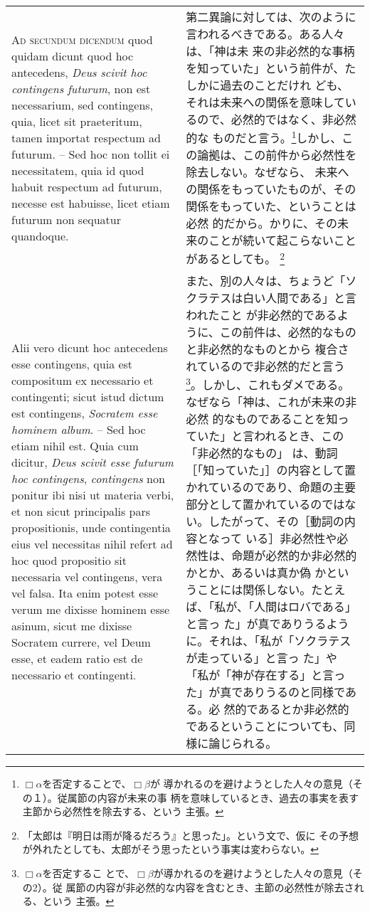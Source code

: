\documentclass[10pt]{jsarticle} %
\begin{document}
\begin{longtable}{p{21em}p{21em}}
\\


{\scshape Ad secundum dicendum} quod quidam dicunt quod hoc
antecedens, {\itshape Deus scivit hoc contingens futurum}, non est
necessarium, sed contingens, quia, licet sit praeteritum, tamen
importat respectum ad futurum. -- Sed hoc non tollit ei necessitatem,
quia id quod habuit respectum ad futurum, necesse est habuisse, licet
etiam futurum non sequatur quandoque.

&

第二異論に対しては、次のように言われるべきである。ある人々は、「神は未
来の非必然的な事柄を知っていた」という前件が、たしかに過去のことだけれ
ども、それは未来への関係を意味しているので、必然的ではなく、非必然的な
ものだと言う。\footnote{$\Box \alpha$を否定することで、$\Box \beta$が
導かれるのを避けようとした人々の意見（その１）。従属節の内容が未来の事
柄を意味しているとき、過去の事実を表す主節から必然性を除去する、という
主張。}しかし、この論拠は、この前件から必然性を除去しない。なぜなら、
未来への関係をもっていたものが、その関係をもっていた、ということは必然
的だから。かりに、その未来のことが続いて起こらないことがあるとしても。
\footnote{「太郎は『明日は雨が降るだろう』と思った」。という文で、仮に
その予想が外れたとしても、太郎がそう思ったという事実は変わらない。}


\\


Alii vero dicunt hoc antecedens esse contingens, quia est compositum
ex necessario et contingenti; sicut istud dictum est contingens,
{\itshape Socratem esse hominem album}. -- Sed hoc etiam nihil
est. Quia cum dicitur, {\itshape Deus scivit esse futurum hoc
contingens}, {\itshape contingens} non ponitur ibi nisi ut materia
verbi, et non sicut principalis pars propositionis, unde contingentia
eius vel necessitas nihil refert ad hoc quod propositio sit necessaria
vel contingens, vera vel falsa. Ita enim potest esse verum me dixisse
hominem esse asinum, sicut me dixisse Socratem currere, vel Deum esse,
et eadem ratio est de necessario et contingenti.

&

また、別の人々は、ちょうど「ソクラテスは白い人間である」と言われたこと
が非必然的であるように、この前件は、必然的なものと非必然的なものとから
複合されているので非必然的だと言う\footnote{$\Box \alpha$を否定するこ
とで、$\Box \beta$が導かれるのを避けようとした人々の意見（その2）。従
属節の内容が非必然的な内容を含むとき、主節の必然性が除去される、という
主張。}。しかし、これもダメである。なぜなら「神は、これが未来の非必然
的なものであることを知っていた」と言われるとき、この「非必然的なもの」
は、動詞［「知っていた」］の内容として置かれているのであり、命題の主要
部分として置かれているのではない。したがって、その［動詞の内容となって
いる］非必然性や必然性は、命題が必然的か非必然的かとか、あるいは真か偽
かということには関係しない。たとえば、「私が、「人間はロバである」と言っ
た」が真でありうるように。それは、「私が「ソクラテスが走っている」と言っ
た」や「私が「神が存在する」と言った」が真でありうるのと同様である。必
然的であるとか非必然的であるということについても、同様に論じられる。


\end{longtable}
\end{document}
